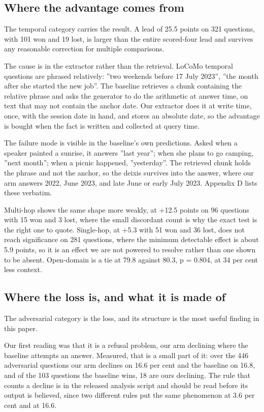\documentclass[10pt,a4paper,twocolumn]{article}
\begin{document}
\subsection{Where the advantage comes from}

The temporal category carries the result. A lead of 25.5 points on 321 questions, with 101 won and 19 lost, is larger than the entire scored-four lead and survives any reasonable correction for multiple comparisons.

The cause is in the extractor rather than the retrieval. LoCoMo temporal questions are phrased relatively: ''two weekends before 17 July 2023'', ''the month after she started the new job''. The baseline retrieves a chunk containing the relative phrase and asks the generator to do the arithmetic at answer time, on text that may not contain the anchor date. Our extractor does it at write time, once, with the session date in hand, and stores an absolute date, so the advantage is bought when the fact is written and collected at query time.

The failure mode is visible in the baseline's own predictions. Asked when a speaker painted a sunrise, it answers ''last year''; when she plans to go camping, ''next month''; when a picnic happened, ''yesterday''. The retrieved chunk holds the phrase and not the anchor, so the deixis survives into the answer, where our arm answers 2022, June 2023, and late June or early July 2023. Appendix D lists these verbatim.

Multi-hop shows the same shape more weakly, at +12.5 points on 96 questions with 15 won and 3 lost, where the small discordant count is why the exact test is the right one to quote. Single-hop, at +5.3 with 51 won and 36 lost, does not reach significance on 281 questions, where the minimum detectable effect is about 5.9 points, so it is an effect we are not powered to resolve rather than one shown to be absent. Open-domain is a tie at 79.8 against 80.3, p = 0.804, at 34 per cent less context.

\subsection{Where the loss is, and what it is made of}

The adversarial category is the loss, and its structure is the most useful finding in this paper.

Our first reading was that it is a refusal problem, our arm declining where the baseline attempts an answer. Measured, that is a small part of it: over the 446 adversarial questions our arm declines on 16.6 per cent and the baseline on 16.8, and of the 103 questions the baseline wins, 18 are ours declining. The rule that counts a decline is in the released analysis script and should be read before its output is believed, since two different rules put the same phenomenon at 3.6 per cent and at 16.6.
\end{document}
